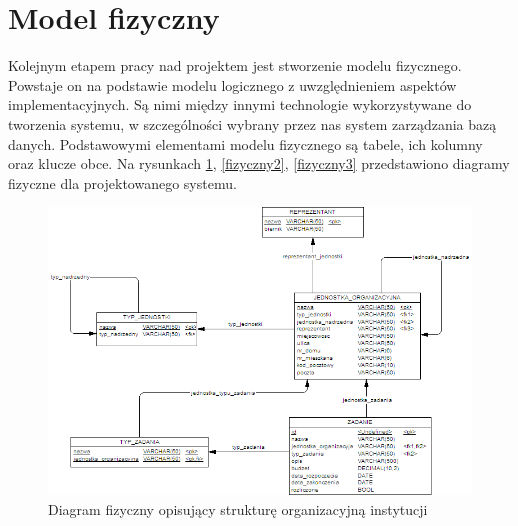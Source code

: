 \section[Model fizyczny][Model fizyczny]{Model fizyczny}
\label{modelFizyczny}
Kolejnym etapem pracy nad projektem jest stworzenie modelu fizycznego. Powstaje on na podstawie modelu logicznego z uwzględnieniem aspektów implementacyjnych. Są nimi między innymi technologie wykorzystywane do tworzenia systemu, w szczególności wybrany przez nas system zarządzania bazą danych. Podstawowymi elementami modelu fizycznego są tabele, ich kolumny oraz klucze obce. Na rysunkach \ref{fizyczny1}, \ref{fizyczny2}, \ref{fizyczny3} przedstawiono diagramy fizyczne dla projektowanego systemu.



\begin{figure}[tdh]
    \begin{center}
	\includegraphics[scale=.8]{img/fizyczny1.png}
	\caption{Diagram fizyczny opisujący strukturę organizacyjną instytucji}
	\label{fizyczny1}
    \end{center}
\end{figure}
